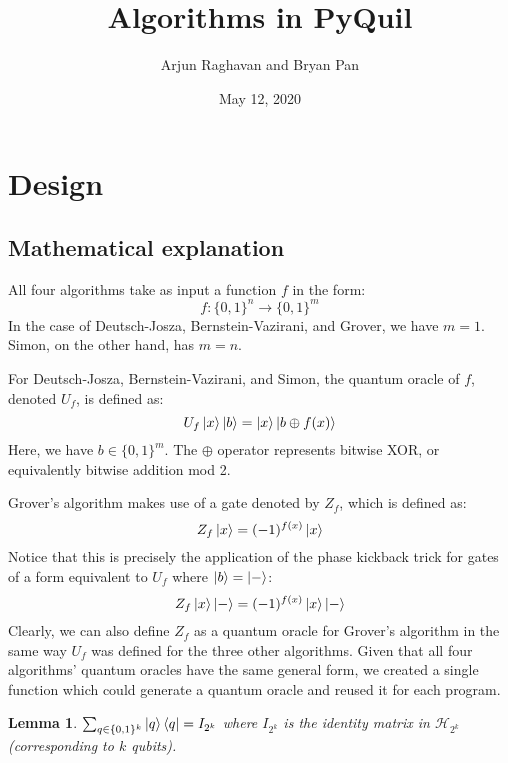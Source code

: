 \documentclass[12pt]{article}
\title{Algorithms in PyQuil}
\author{Arjun Raghavan and Bryan Pan}
\date{May 12, 2020}
\newtheorem{lemma}{Lemma}
\begin{document}
\mktitle
\startbody

\section{Design}

\subsection{Mathematical explanation}

All four algorithms take as input a function $f$ in the form:
\[
    f : \{0,1\}^n \to \{0,1\}^m
\]
In the case of Deutsch-Josza, Bernstein-Vazirani, and Grover, we have $m=1$.
Simon, on the other hand, has $m=n$.

For Deutsch-Josza, Bernstein-Vazirani, and Simon, the quantum oracle of $f$, denoted $U_f$, is defined as:
\[
    U_f\ket{x}\ket{b} = \ket{x}\ket{b \oplus f(x)}
\]
Here, we have $b \in \{0,1\}^m$.
The $\oplus$ operator represents bitwise XOR, or equivalently bitwise addition mod 2.

Grover's algorithm makes use of a gate denoted by $Z_f$, which is defined as:
\[
    Z_f\ket{x} = (-1)^{f(x)}\ket{x}
\]
Notice that this is precisely the application of the phase kickback trick for gates of a form equivalent to $U_f$ where $\ket{b} = \ket{-}$:
\[
    Z_f\ket{x}\ket{-} = (-1)^{f(x)}\ket{x}\ket{-}
\]
Clearly, we can also define $Z_f$ as a quantum oracle for Grover's algorithm in the same way $U_f$ was defined for the three other algorithms.
Given that all four algorithms' quantum oracles have the same general form, we created a single function which could generate a quantum oracle and reused it for each program.

\begin{lemma}
    $\sum_{q \in \{0,1\}^k}{\ket{q}\bra{q}} = I_{2^k}$ where $I_{2^k}$ is the identity matrix in $\mathcal{H}_{2^k}$ (corresponding to $k$ qubits).
\end{lemma}
\end{document}

